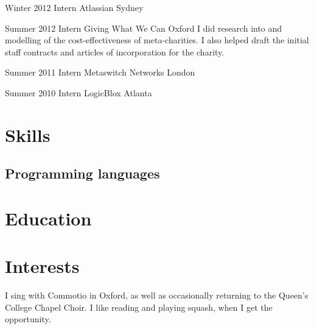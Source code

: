 \documentclass[12pt,a4paper,sans]{moderncv}
\begin{document}
\cventry
{Winter 2012}
{Intern}
{Atlassian}
{Sydney}
{}
{}

\cventry
{Summer 2012}
{Intern}
{Giving What We Can}
{Oxford}
{}
{
  I did research into and modelling of the cost-effectiveness of meta-charities.
  I also helped draft the initial staff contracts and articles of incorporation for the charity.
}

\cventry
{Summer 2011}
{Intern}
{Metaswitch Networks}
{London}
{}
{}

\cventry
{Summer 2010}
{Intern}
{LogicBlox}
{Atlanta}
{}
{}

\section{Skills}

\subsection{Programming languages}


\nocite{*}
\printbibliography[title={Publications}]

\section{Education}

\section{Interests}
I sing with Commotio in Oxford, as well as occasionally returning to the Queen's College Chapel Choir. I like reading and playing squash, when I get the opportunity.
\end{document}
